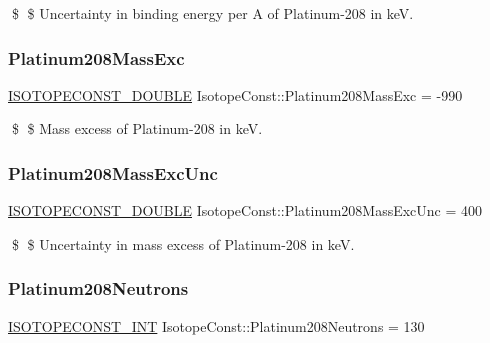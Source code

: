 \$ \$ Uncertainty in binding energy per A of Platinum-\/208 in keV. \mbox{\label{group___isotope_const-_platinum-_pt208_ga33942a40953b560ef9b139cddb48e28a}} 
\subsubsection{\texorpdfstring{Platinum208\+Mass\+Exc}{Platinum208MassExc}}
{\footnotesize\ttfamily \mbox{\hyperlink{group___isotope_const-_macros_ga8f45a7272ce02c0b4c65c44636ed719a}{I\+S\+O\+T\+O\+P\+E\+C\+O\+N\+S\+T\+\_\+\+D\+O\+U\+B\+LE}} Isotope\+Const\+::\+Platinum208\+Mass\+Exc = -\/990}

\$ \$ Mass excess of Platinum-\/208 in keV. \mbox{\label{group___isotope_const-_platinum-_pt208_ga4334dce7ad5af752eaa61ecb27ac67c9}} 
\subsubsection{\texorpdfstring{Platinum208\+Mass\+Exc\+Unc}{Platinum208MassExcUnc}}
{\footnotesize\ttfamily \mbox{\hyperlink{group___isotope_const-_macros_ga8f45a7272ce02c0b4c65c44636ed719a}{I\+S\+O\+T\+O\+P\+E\+C\+O\+N\+S\+T\+\_\+\+D\+O\+U\+B\+LE}} Isotope\+Const\+::\+Platinum208\+Mass\+Exc\+Unc = 400}

\$ \$ Uncertainty in mass excess of Platinum-\/208 in keV. \mbox{\label{group___isotope_const-_platinum-_pt208_gada4146cdbbfd479622324c8d13c7e234}} 
\subsubsection{\texorpdfstring{Platinum208\+Neutrons}{Platinum208Neutrons}}
{\footnotesize\ttfamily \mbox{\hyperlink{group___isotope_const-_macros_ga5f18360b3e99483a35c32d789e62621c}{I\+S\+O\+T\+O\+P\+E\+C\+O\+N\+S\+T\+\_\+\+I\+NT}} Isotope\+Const\+::\+Platinum208\+Neutrons = 130}


